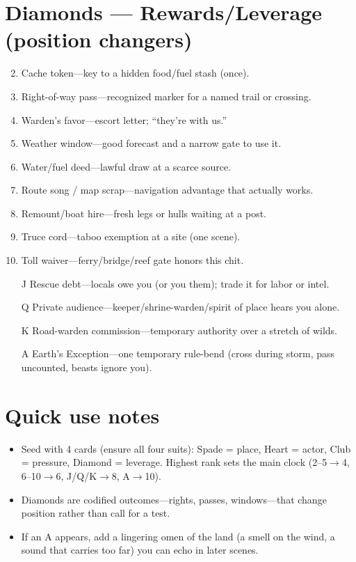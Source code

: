 \section*{Diamonds --- Rewards/Leverage (position changers)}
\begin{enumerate}
\setcounter{enumi}{1}
\item Cache token---key to a hidden food/fuel stash (once).
\item Right-of-way pass---recognized marker for a named trail or crossing.
\item Warden's favor---escort letter; ``they're with us.''
\item Weather window---good forecast and a narrow gate to use it.
\item Water/fuel deed---lawful draw at a scarce source.
\item Route song / map scrap---navigation advantage that actually works.
\item Remount/boat hire---fresh legs or hulls waiting at a post.
\item Truce cord---taboo exemption at a site (one scene).
\item Toll waiver---ferry/bridge/reef gate honors this chit.
\item[J] Rescue debt---locals owe you (or you them); trade it for labor or intel.
\item[Q] Private audience---keeper/shrine-warden/spirit of place hears you alone.
\item[K] Road-warden commission---temporary authority over a stretch of wilds.
\item[A] Earth's Exception---one temporary rule-bend (cross during storm, pass uncounted, beasts ignore you).
\end{enumerate}

\section*{Quick use notes}
\begin{itemize}
\item Seed with 4 cards (ensure all four suits): Spade = place, Heart = actor, Club = pressure, Diamond = leverage. Highest rank sets the main clock (2--5$\rightarrow$4, 6--10$\rightarrow$6, J/Q/K$\rightarrow$8, A$\rightarrow$10).
\item Diamonds are codified outcomes---rights, passes, windows---that change position rather than call for a test.
\item If an A appears, add a lingering omen of the land (a smell on the wind, a sound that carries too far) you can echo in later scenes.
\end{itemize}

